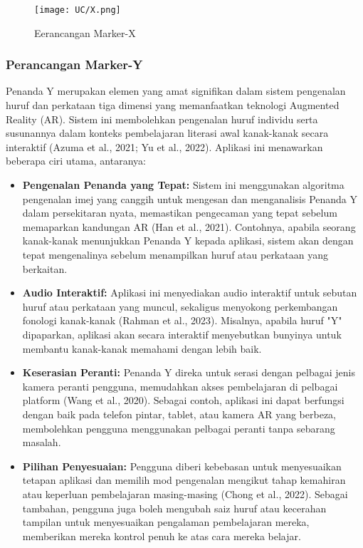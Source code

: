 \begin{itemize}
\begin{itemize}
\begin{itemize}
\begin{itemize}
\begin{itemize}
\begin{itemize}
\begin{itemize}
\clearpage
\begin{figure}[h]
     \centering
     \texttt{[image: UC/X.png]}
     \caption{Eerancangan Marker-X}
     \label{fig:enterY}
 \end{figure}
 
\clearpage
\subsubsection{Perancangan Marker-Y}

Penanda Y merupakan elemen yang amat signifikan dalam sistem pengenalan huruf dan perkataan tiga dimensi yang memanfaatkan teknologi Augmented Reality (AR). Sistem ini membolehkan pengenalan huruf individu serta susunannya dalam konteks pembelajaran literasi awal kanak-kanak secara interaktif (Azuma et al., 2021; Yu et al., 2022). Aplikasi ini menawarkan beberapa ciri utama, antaranya:  \\
\begin{itemize}  
\item \textbf{Pengenalan Penanda yang Tepat:} Sistem ini menggunakan algoritma pengenalan imej yang canggih untuk mengesan dan menganalisis Penanda Y dalam persekitaran nyata, memastikan pengecaman yang tepat sebelum memaparkan kandungan AR (Han et al., 2021). Contohnya, apabila seorang kanak-kanak menunjukkan Penanda Y kepada aplikasi, sistem akan dengan tepat mengenalinya sebelum menampilkan huruf atau perkataan yang berkaitan.  \\
\item \textbf{Audio Interaktif:} Aplikasi ini menyediakan audio interaktif untuk sebutan huruf atau perkataan yang muncul, sekaligus menyokong perkembangan fonologi kanak-kanak (Rahman et al., 2023). Misalnya, apabila huruf "Y" dipaparkan, aplikasi akan secara interaktif menyebutkan bunyinya untuk membantu kanak-kanak memahami dengan lebih baik. \\ 
\item \textbf{Keserasian Peranti:} Penanda Y direka untuk serasi dengan pelbagai jenis kamera peranti pengguna, memudahkan akses pembelajaran di pelbagai platform (Wang et al., 2020). Sebagai contoh, aplikasi ini dapat berfungsi dengan baik pada telefon pintar, tablet, atau kamera AR yang berbeza, membolehkan pengguna menggunakan pelbagai peranti tanpa sebarang masalah.  \\
\item \textbf{Pilihan Penyesuaian:} Pengguna diberi kebebasan untuk menyesuaikan tetapan aplikasi dan memilih mod pengenalan mengikut tahap kemahiran atau keperluan pembelajaran masing-masing (Chong et al., 2022). Sebagai tambahan, pengguna juga boleh mengubah saiz huruf atau kecerahan tampilan untuk menyesuaikan pengalaman pembelajaran mereka, memberikan mereka kontrol penuh ke atas cara mereka belajar.  


\end{itemize}
\end{itemize}
\end{itemize}
\end{itemize}
\end{itemize}
\end{itemize}
\end{itemize}
\end{itemize}
